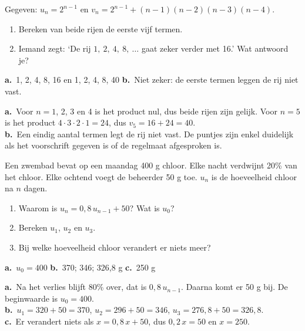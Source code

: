 \begin{oefeningen}
\begin{oefening}[2]
Gegeven: $u_n = 2^{n-1}$ en $v_n = 2^{n-1} + (n-1)(n-2)(n-3)(n-4)$.
\begin{enumerate}
  \item Bereken van beide rijen de eerste vijf termen.
  \item Iemand zegt: `De rij $1,\ 2,\ 4,\ 8,\ \ldots$ gaat zeker verder met 16.' Wat antwoord je?
\end{enumerate}
\begin{solution}
\textbf{a.}~1, 2, 4, 8, 16 en 1, 2, 4, 8, 40 \quad \textbf{b.}~Niet zeker: de eerste termen leggen de rij niet vast.
\end{solution}
\begin{fullsolution}
\textbf{a.}~Voor $n=1$, 2, 3 en 4 is het product nul, dus beide rijen zijn gelijk. Voor $n=5$ is het product $4\cdot 3\cdot 2\cdot 1=24$, dus $v_5=16+24=40$.\\
\textbf{b.}~Een eindig aantal termen legt de rij niet vast. De puntjes zijn enkel duidelijk als het voorschrift gegeven is of de regelmaat afgesproken is.
\end{fullsolution}
\end{oefening}

\begin{oefening}[2]
Een zwembad bevat op een maandag 400 g chloor. Elke nacht verdwijnt 20\% van het chloor. Elke ochtend voegt de beheerder 50 g toe. $u_n$ is de hoeveelheid chloor na $n$ dagen.
\begin{enumerate}
  \item Waarom is $u_n = 0{,}8\,u_{n-1} + 50$? Wat is $u_0$?
  \item Bereken $u_1$, $u_2$ en $u_3$.
  \item Bij welke hoeveelheid chloor verandert er niets meer?
\end{enumerate}
\begin{solution}
\textbf{a.}~$u_0=400$ \quad \textbf{b.}~370; 346; 326,8 g \quad \textbf{c.}~250 g
\end{solution}
\begin{fullsolution}
\textbf{a.}~Na het verlies blijft 80\% over, dat is $0{,}8\,u_{n-1}$. Daarna komt er 50 g bij. De beginwaarde is $u_0=400$.\\
\textbf{b.}~$u_1=320+50=370$, $u_2=296+50=346$, $u_3=276{,}8+50=326{,}8$.\\
\textbf{c.}~Er verandert niets als $x=0{,}8\,x+50$, dus $0{,}2\,x=50$ en $x=250$.
\end{fullsolution}
\end{oefening}


\end{oefeningen}
